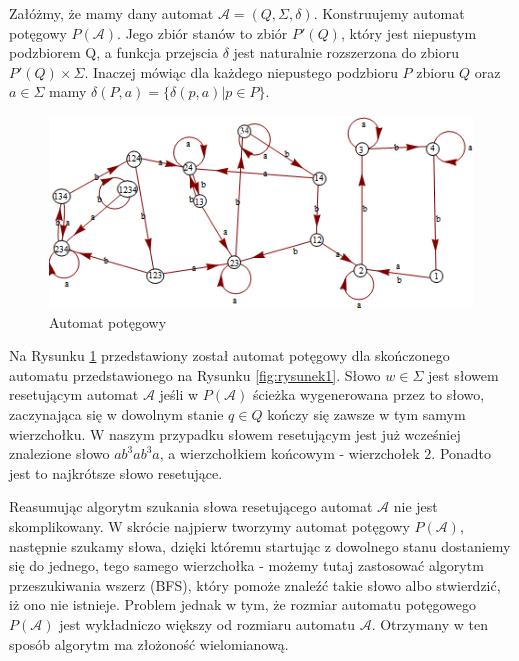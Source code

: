 \documentclass[12pt,a4paper]{article}
\begin{document}
Za{\l}\'{o}\.{z}my, \.{z}e mamy dany automat  $\mathscr{A}=(Q, \Sigma, \delta)$. Konstruujemy automat pot\k{e}gowy $P(\mathscr{A})$. Jego zbi\'{o}r stan\'{o}w to zbi\'{o}r $P'(Q)$, kt\'{o}ry jest niepustym podzbiorem Q, a funkcja przejscia $\delta$ jest naturalnie rozszerzona do zbioru $P'(Q)\times \Sigma$. Inaczej m\'{o}wi\k{a}c dla ka\.{z}dego niepustego podzbioru $P$ zbioru $Q$ oraz $a \in \Sigma$ mamy $\delta(P,a)=\{\delta(p,a) | p \in P\}$.
\\
\begin{figure}[H]
    \includegraphics[width=1.1\textwidth]{rysunek6}
    \caption{Automat pot\k{e}gowy}
    \label{fig:rysunek6}
\end{figure}

Na Rysunku \ref{fig:rysunek6} przedstawiony zosta{\l} automat pot\k{e}gowy dla sko\'{n}czonego automatu przedstawionego na Rysunku \ref{fig:rysunek1}. S{\l}owo $w \in \Sigma$ jest s{\l}owem resetuj\k{a}cym automat $\mathscr{A}$ je\'{s}li w $P(\mathscr{A})$ \'{s}cie\.{z}ka wygenerowana przez to s{\l}owo, zaczynaj\k{a}ca si\k{e} w dowolnym stanie $q \in Q$ ko\'{n}czy si\k{e} zawsze w tym samym wierzcho{\l}ku. W naszym przypadku s{\l}owem resetuj\k{a}cym jest ju\.{z} wcze\'{s}niej znalezione s{\l}owo $ab^3ab^3a$, a wierzcho{\l}kiem ko\'{n}cowym - wierzcho{\l}ek $2$. Ponadto jest to najkr\'{o}tsze s{\l}owo resetuj\k{a}ce. 

Reasumuj\k{a}c algorytm szukania s{\l}owa resetuj\k{a}cego automat $\mathscr{A}$ nie jest skomplikowany. W skr\'{o}cie najpierw tworzymy automat pot\k{e}gowy $P(\mathscr{A})$, nast\k{e}pnie szukamy s{\l}owa, dzi\k{e}ki kt\'{o}remu startuj\k{a}c z dowolnego stanu dostaniemy si\k{e} do jednego, tego samego wierzcho{\l}ka - mo\.{z}emy tutaj zastosowa\'{c} algorytm przeszukiwania 
wszerz (BFS), kt\'{o}ry pomo\.{z}e znale\'{z}\'{c} takie s{\l}owo albo stwierdzi\'{c}, i\.{z} ono nie istnieje. Problem jednak w tym, \.{z}e rozmiar automatu pot\k{e}gowego $P(\mathscr{A})$ jest wyk{\l}adniczo wi\k{e}kszy od rozmiaru automatu $\mathscr{A}$. Otrzymany w ten spos\'{o}b algorytm ma z{\l}o\.{z}ono\'{s}\'{c} wielomianow\k{a}.
\end{document}
